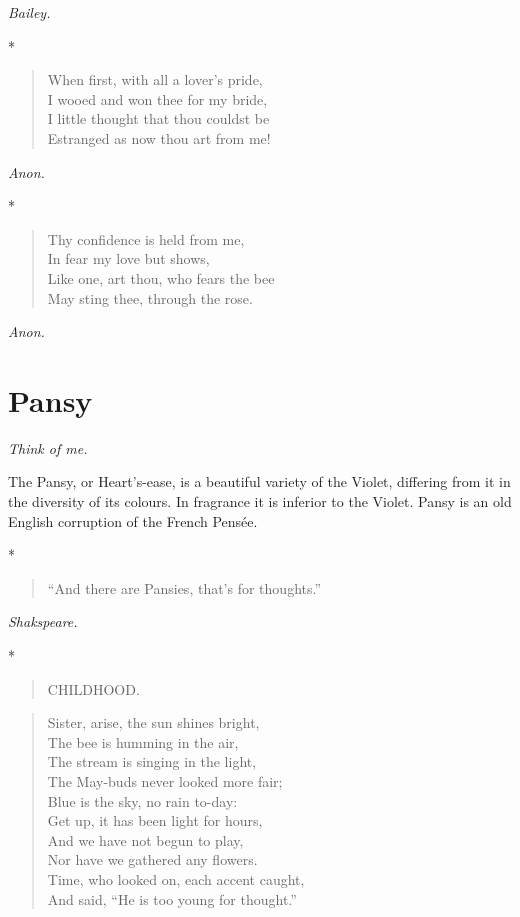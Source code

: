 \documentclass[11pt,twoside]{article}
\newcommand\flower[2]{\section*{#1}\addcontentsline{toc}{section}{#1}%
  \noindent\textit{#2.}\par\medskip}
\newcommand\stars{\begin{center}*\quad*\quad*\end{center}}
\newcommand\by[1]{\par\hfill\textit{#1}\par}
\begin{document}
\by{Bailey.}

\stars

\begin{verse}
When first, with all a lover’s pride,\\
I wooed and won thee for my bride,\\
I little thought that thou couldst be\\
Estranged as now thou art from me!
\end{verse}

\by{Anon.}

\stars

\begin{verse}
Thy confidence is held from me,\\
\quad In fear my love but shows,\\
Like one, art thou, who fears the bee\\
\quad May sting thee, through the rose.
\end{verse}

\by{Anon.}

\flower{Pansy}{Think of me}

The Pansy, or Heart’s-ease, is a beautiful variety of the Violet, differing from it in the diversity of its colours. In fragrance it is inferior to the Violet. Pansy is an old English corruption of the French Pensée.

\stars

\begin{verse}
“And there are Pansies, that’s for thoughts.”
\end{verse}

\by{Shakspeare.}

\stars

\begin{verse}
CHILDHOOD.
\end{verse}

\begin{verse}
Sister, arise, the sun shines bright,\\
\quad The bee is humming in the air,\\
The stream is singing in the light,\\
\quad The May-buds never looked more fair;\\
Blue is the sky, no rain to-day:\\
\quad Get up, it has been light for hours,\\
And we have not begun to play,\\
\quad Nor have we gathered any flowers.\\
Time, who looked on, each accent caught,\\
And said, “He is too young for thought.”
\end{verse}
\end{document}
